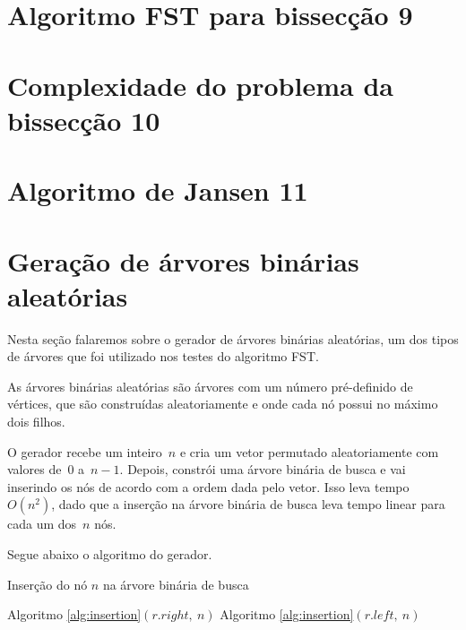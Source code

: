 \documentclass[a4paper,12pt]{article}
\begin{document}
\section {Algoritmo FST para bissecção 9}



\section {Complexidade do problema da bissecção 10}



\section {Algoritmo de Jansen 11}



\newpage

\section {Geração de árvores binárias aleatórias}
	Nesta seção falaremos sobre o gerador de árvores binárias aleatórias, um dos tipos de árvores que foi utilizado nos
	testes do algoritmo FST.

	As árvores binárias aleatórias são árvores com um número
	pré-definido de vértices, que são construídas
	aleatoriamente e onde cada nó possui no máximo dois filhos.

	O gerador recebe um inteiro~$n$ e cria um vetor permutado
	aleatoriamente com valores de~$0$ a~$n-1$.
	Depois, constrói uma árvore binária de busca e vai
	inserindo os nós de acordo com a ordem dada pelo vetor.
	Isso leva tempo~$O(n^2)$, dado que a inserção na 
	árvore binária de busca leva tempo linear para cada um 
	dos~$n$ nós.

	Segue abaixo o algoritmo do gerador.
	\bigskip
	\bigskip

	\begin{algorithm}[H]
	\label{alg:insertion}

		\caption{Inserção do nó $n$ na árvore binária de busca}
		\Output{}
		{
			{
				Algoritmo \ref{alg:insertion}$(r.right,~n)$\;
			}
		}
		{
			{
				Algoritmo \ref{alg:insertion}$(r.left, ~n)$\;
			}
		}

	\end{algorithm}	
\end{document}
